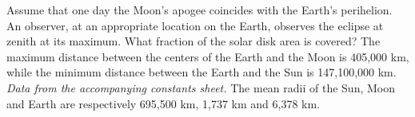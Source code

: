 Assume that one day the Moon's apogee coincides with the Earth's perihelion. An observer, at an appropriate
location on the Earth, observes the eclipse at zenith at its maximum. What fraction of the solar disk area is covered?
The maximum distance between the centers of the Earth and the Moon is 405,000 km, while the minimum
distance between the Earth and the Sun is 147,100,000 km.
\textit{Data from the accompanying constants sheet.}
The mean radii of the Sun, Moon and Earth are respectively 695,500 km, 1,737 km and 6,378 km.
